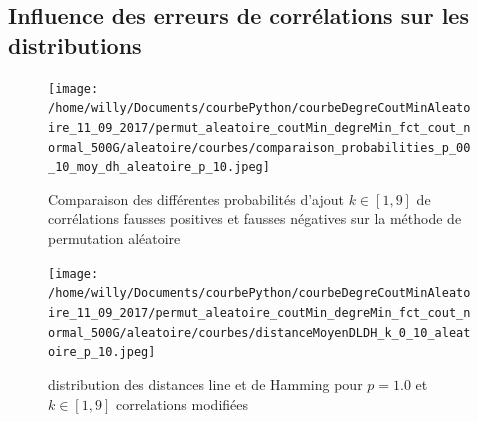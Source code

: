 \documentclass[onecolumn, 12pt]{book}
\begin{document}
\subsection{Influence des erreurs de corr\'elations sur les distributions}
\begin{centering} 
\begin{figure}[htb!] 
\texttt{[image: /home/willy/Documents/courbePython/courbeDegreCoutMinAleatoire\_11\_09\_2017/permut\_aleatoire\_coutMin\_degreMin\_fct\_cout\_normal\_500G/aleatoire/courbes/comparaison\_probabilities\_p\_00\_10\_moy\_dh\_aleatoire\_p\_10.jpeg]}
\caption{ Comparaison des diff\'erentes probabilit\'es d'ajout $k \in [1,9]$ de corr\'elations fausses positives et fausses n\'egatives sur la m\'ethode de permutation al\'eatoire }
\label{compareDifferentesProbabilitesP0_1_fct_cout_unitaire_p05} 
\end{figure}
\end{centering} 

\begin{centering} 
\begin{figure}[htb!] 
\texttt{[image: /home/willy/Documents/courbePython/courbeDegreCoutMinAleatoire\_11\_09\_2017/permut\_aleatoire\_coutMin\_degreMin\_fct\_cout\_normal\_500G/aleatoire/courbes/distanceMoyenDLDH\_k\_0\_10\_aleatoire\_p\_10.jpeg]}
\caption{ distribution des distances line et de Hamming pour $p=1.0$ et $k \in [1,9]$ correlations modifi\'ees}
\label{distributionDLDH_p1.0_k19_fct_cout_unitaire} 
\end{figure}
\end{centering} 
\end{document}
